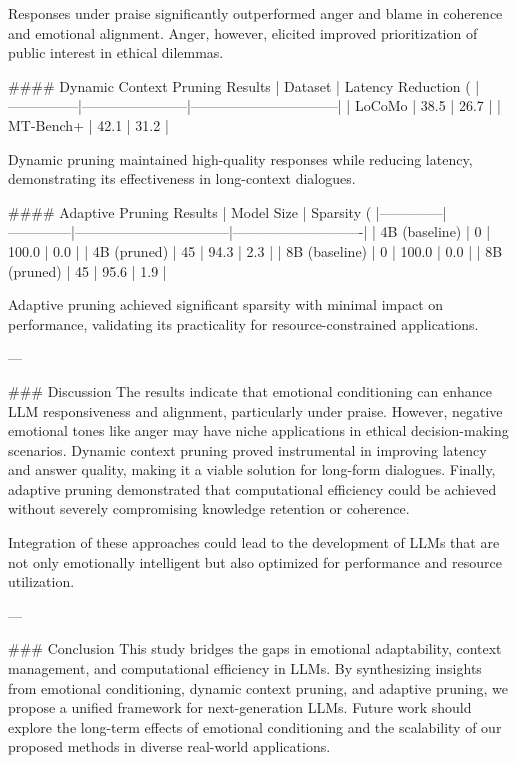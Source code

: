 Responses under praise significantly outperformed anger and blame in coherence and emotional alignment. Anger, however, elicited improved prioritization of public interest in ethical dilemmas.  

#### Dynamic Context Pruning Results  
| Dataset       | Latency Reduction (%
|---------------|-----------------------|--------------------------------|  
| LoCoMo        | 38.5                  | 26.7                           |  
| MT-Bench+     | 42.1                  | 31.2                           |  

Dynamic pruning maintained high-quality responses while reducing latency, demonstrating its effectiveness in long-context dialogues.  

#### Adaptive Pruning Results  
| Model Size   | Sparsity (%
|--------------|--------------|---------------------------------|----------------------------|  
| 4B (baseline) | 0            | 100.0                          | 0.0                        |  
| 4B (pruned)  | 45           | 94.3                           | 2.3                        |  
| 8B (baseline) | 0            | 100.0                          | 0.0                        |  
| 8B (pruned)  | 45           | 95.6                           | 1.9                        |  

Adaptive pruning achieved significant sparsity with minimal impact on performance, validating its practicality for resource-constrained applications.

---

### Discussion  
The results indicate that emotional conditioning can enhance LLM responsiveness and alignment, particularly under praise. However, negative emotional tones like anger may have niche applications in ethical decision-making scenarios. Dynamic context pruning proved instrumental in improving latency and answer quality, making it a viable solution for long-form dialogues. Finally, adaptive pruning demonstrated that computational efficiency could be achieved without severely compromising knowledge retention or coherence.

Integration of these approaches could lead to the development of LLMs that are not only emotionally intelligent but also optimized for performance and resource utilization.

---

### Conclusion  
This study bridges the gaps in emotional adaptability, context management, and computational efficiency in LLMs. By synthesizing insights from emotional conditioning, dynamic context pruning, and adaptive pruning, we propose a unified framework for next-generation LLMs. Future work should explore the long-term effects of emotional conditioning and the scalability of our proposed methods in diverse real-world applications.


